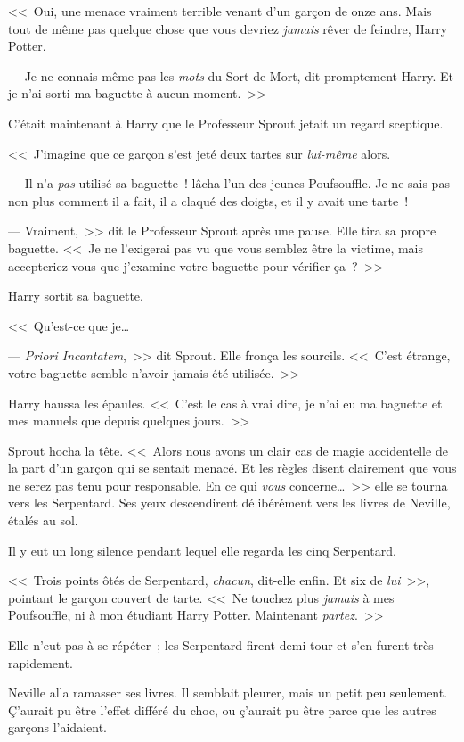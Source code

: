 <<~Oui, une menace vraiment terrible venant d'un garçon de onze ans. Mais tout de même pas quelque chose que vous devriez \emph{jamais} rêver de feindre, Harry Potter.

--- Je ne connais même pas les \emph{mots} du Sort de Mort, dit promptement Harry. Et je n'ai sorti ma baguette à aucun moment.~>>

C'était maintenant à Harry que le Professeur Sprout jetait un regard sceptique.

<<~J'imagine que ce garçon s'est jeté deux tartes sur \emph{lui-même} alors.

--- Il n'a \emph{pas} utilisé sa baguette~! lâcha l'un des jeunes Poufsouffle. Je ne sais pas non plus comment il a fait, il a claqué des doigts, et il y avait une tarte~!

--- Vraiment,~>> dit le Professeur Sprout après une pause. Elle tira sa propre baguette. <<~Je ne l'exigerai pas vu que vous semblez être la victime, mais accepteriez-vous que j'examine votre baguette pour vérifier ça~?~>>

Harry sortit sa baguette.

<<~Qu'est-ce que je…

--- \emph{Priori Incantatem},~>> dit Sprout. Elle fronça les sourcils. <<~C'est étrange, votre baguette semble n'avoir jamais été utilisée.~>>

Harry haussa les épaules. <<~C'est le cas à vrai dire, je n'ai eu ma baguette et mes manuels que depuis quelques jours.~>>

Sprout hocha la tête. <<~Alors nous avons un clair cas de magie accidentelle de la part d'un garçon qui se sentait menacé. Et les règles disent clairement que vous ne serez pas tenu pour responsable. En ce qui \emph{vous} concerne…~>> elle se tourna vers les Serpentard. Ses yeux descendirent délibérément vers les livres de Neville, étalés au sol.

Il y eut un long silence pendant lequel elle regarda les cinq Serpentard.

<<~Trois points ôtés de Serpentard, \emph{chacun}, dit-elle enfin. Et six de \emph{lui}~>>, pointant le garçon couvert de tarte. <<~Ne touchez plus \emph{jamais} à mes Poufsouffle, ni à mon étudiant Harry Potter. Maintenant \emph{partez}.~>>

Elle n'eut pas à se répéter~; les Serpentard firent demi-tour et s'en furent très rapidement.

Neville alla ramasser ses livres. Il semblait pleurer, mais un petit peu seulement. Ç'aurait pu être l'effet différé du choc, ou ç'aurait pu être parce que les autres garçons l'aidaient.

